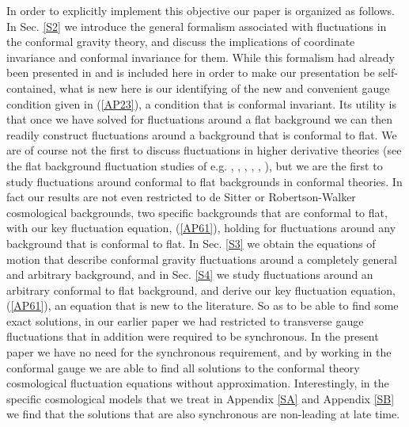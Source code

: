 \documentclass[aps]{revtex4}
\begin{document}
In order to explicitly implement this objective our paper is organized as follows. In Sec. \ref{S2} we introduce the general formalism associated with fluctuations in the conformal gravity theory, and discuss the implications of coordinate invariance and conformal invariance for them. While this formalism had already been presented in \cite{Mannheim2012a} and is included here in order to make our presentation be self-contained, what is new here is our identifying of the new and convenient gauge condition given in  (\ref{AP23}), a condition that is conformal invariant. Its utility is that once we have solved for fluctuations around a flat background we can then readily construct fluctuations around a background that is conformal to flat. We are of course not the first to discuss fluctuations in higher derivative theories (see the flat background fluctuation studies of e.g. \cite{Stelle1977}, \cite{Stelle1978}, \cite{Lee1982}, \cite{Riegert1984a}, \cite{Riegert1984b}, \cite{Teyssandier1989}), but we are the first to study fluctuations around conformal to flat backgrounds in conformal theories. In fact our results are not even restricted to de Sitter or Robertson-Walker cosmological backgrounds, two specific backgrounds that are conformal  to flat, with our key fluctuation equation, (\ref{AP61}), holding for fluctuations around any background that is conformal to flat. In Sec. \ref{S3} we obtain the equations of motion that describe conformal gravity fluctuations around a completely general and arbitrary background, and in Sec. \ref{S4} we study fluctuations around an arbitrary conformal to flat background, and derive our key fluctuation equation, (\ref{AP61}), an equation that is new to the literature. So as to be able to find some exact solutions, in our earlier paper \cite{Mannheim2012a} we had restricted to transverse gauge fluctuations that in addition were required to be synchronous. In the present paper we have no need for the synchronous requirement, and by working in the conformal gauge we are able to find all solutions to the conformal theory cosmological fluctuation equations without approximation. Interestingly, in the specific cosmological models that we treat in Appendix \ref{SA} and Appendix \ref{SB} we find that  the solutions that are also synchronous are non-leading at late time.
\end{document}
